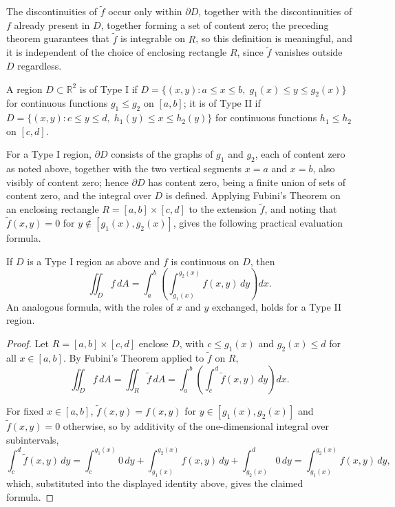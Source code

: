 The discontinuities of $\tilde f$ occur only within $\partial D$, together with the discontinuities of $f$ already present in $D$, together forming a set of content zero; the preceding theorem guarantees that $\tilde f$ is integrable on $R$, so this definition is meaningful, and it is independent of the choice of enclosing rectangle $R$, since $\tilde f$ vanishes outside $D$ regardless.

\begin{definition}
A region $D \subset \mathbb{R}^2$ is of Type I if $D = \{(x,y) : a \leq x \leq b, \; g_1(x) \leq y \leq g_2(x)\}$ for continuous functions $g_1 \leq g_2$ on $[a,b]$; it is of Type II if $D = \{(x,y) : c \leq y \leq d, \; h_1(y) \leq x \leq h_2(y)\}$ for continuous functions $h_1 \leq h_2$ on $[c,d]$.
\end{definition}

For a Type I region, $\partial D$ consists of the graphs of $g_1$ and $g_2$, each of content zero as noted above, together with the two vertical segments $x=a$ and $x=b$, also visibly of content zero; hence $\partial D$ has content zero, being a finite union of sets of content zero, and the integral over $D$ is defined. Applying Fubini's Theorem on an enclosing rectangle $R = [a,b]\times[c,d]$ to the extension $\tilde f$, and noting that $\tilde f(x,y) = 0$ for $y \notin [g_1(x),g_2(x)]$, gives the following practical evaluation formula.

\begin{theorem}
If $D$ is a Type I region as above and $f$ is continuous on $D$, then
\[
\iint_D f\, dA = \int_a^b \left( \int_{g_1(x)}^{g_2(x)} f(x,y)\, dy \right) dx.
\]
An analogous formula, with the roles of $x$ and $y$ exchanged, holds for a Type II region.
\end{theorem}

\begin{proof}
Let $R = [a,b]\times[c,d]$ enclose $D$, with $c \leq g_1(x)$ and $g_2(x) \leq d$ for all $x \in [a,b]$. By Fubini's Theorem applied to $\tilde f$ on $R$,
\[
\iint_D f \, dA = \iint_R \tilde f \, dA = \int_a^b \left( \int_c^d \tilde f(x,y)\, dy \right) dx.
\]

For fixed $x \in [a,b]$, $\tilde f(x,y) = f(x,y)$ for $y \in [g_1(x),g_2(x)]$ and $\tilde f(x,y) = 0$ otherwise, so by additivity of the one-dimensional integral over subintervals,
\[
\int_c^d \tilde f(x,y)\, dy = \int_c^{g_1(x)} 0 \, dy + \int_{g_1(x)}^{g_2(x)} f(x,y)\, dy + \int_{g_2(x)}^d 0\, dy = \int_{g_1(x)}^{g_2(x)} f(x,y)\, dy,
\]
which, substituted into the displayed identity above, gives the claimed formula.
\end{proof}

